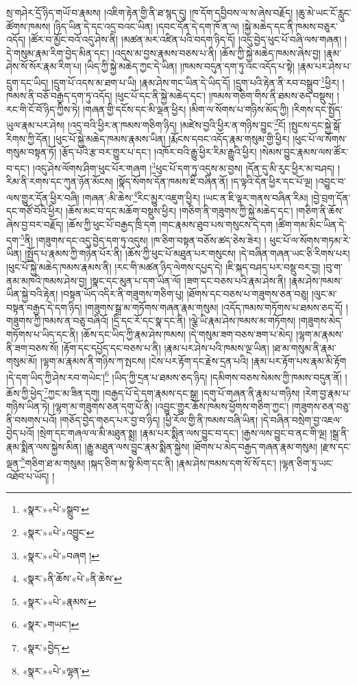 སྲ་གཤེར་དྲོ་ཉིད་གཡོ་བ་རྣམས། །འཇིག་རྟེན་གྱི་ནི་ཐ་སྙད་དུ། །ཁ་དོག་དབྱིབས་ལ་ས་ཞེས་བརྗོད། །ཆུ་མེ་ཡང་ངོ་རླུང་ཚོགས་ཁམས། །ཉིད་ཡིན་དེ་དང་འདྲ་བའང་ཡིན། །དབང་དོན་དེ་དག་ཁོ་ན་ལ། །སྐྱེ་མཆེད་དང་ནི་ཁམས་བཅུར་འདོད། །ཚོར་བ་མྱོང་བའོ་འདུ་ཤེས་ནི། །མཚན་མར་འཛིན་པའི་བདག་ཉིད་དོ། །འདུ་བྱེད་ཕུང་པོ་བཞི་ལས་གཞན། །དེ་གསུམ་རྣམ་རིག་བྱེད་མིན་དང་། །འདུས་མ་བྱས་རྣམས་བཅས་པ་ནི། །ཆོས་ཀྱི་སྐྱེ་མཆེད་ཁམས་ཞེས་བྱ། །རྣམ་ཤེས་སོ་སོར་རྣམ་རིག་པ། །ཡིད་ཀྱི་སྐྱེ་མཆེད་ཀྱང་དེ་ཡིན། །ཁམས་བདུན་དག་ཏུ་འང་འདོད་པ་སྟེ། །རྣམ་པར་ཤེས་པ་དྲུག་དང་ཡིད། །དྲུག་པོ་འདས་མ་ཐག་པ་ཡི། །རྣམ་ཤེས་གང་ཡིན་དེ་ཡིད་དོ། །དྲུག་པའི་རྟེན་ནི་རབ་བསྒྲུབ་\footnote{«སྣར་»«པེ་»སྒྲུབ་}ཕྱིར། །ཁམས་ནི་བཅོ་བརྒྱད་དག་ཏུ་འདོད། །ཕུང་པོ་དང་ནི་སྐྱེ་མཆེད་དང་། །ཁམས་གཅིག་གིས་ནི་ཐམས་ཅད་བསྡུས། །རང་གི་ངོ་བོ་ཉིད་ཀྱིས་ཏེ། །གཞན་གྱི་དངོས་དང་མི་ལྡན་ཕྱིར། །མིག་ལ་སོགས་པ་གཉིས་མོད་ཀྱི། །རིགས་དང་སྤྱོད་ཡུལ་རྣམ་པར་ཤེས། །འདྲ་བའི་ཕྱིར་ན་ཁམས་གཅིག་ཉིད། །མཛེས་བྱའི་ཕྱིར་ན་གཉིས་བྱུང་\footnote{«སྣར་»«པེ་»འབྱུང་}ངོ། །སྤུངས་དང་སྐྱེ་སྒོ་རིགས་ཀྱི་དོན། །ཕུང་པོ་སྐྱེ་མཆེད་ཁམས་རྣམས་ཡིན། །རྨོངས་དབང་འདོད་རྣམ་གསུམ་གྱི་ཕྱིར། །ཕུང་པོ་ལ་སོགས་གསུམ་བསྟན་ཏོ། །རྩོད་པའི་རྩ་བར་གྱུར་པ་དང་། །འཁོར་བའི་རྒྱུ་ཕྱིར་རིམ་རྒྱུའི་ཕྱིར། །སེམས་བྱུང་རྣམས་ལས་ཚོར་བ་དང་། །འདུ་ཤེས་ལོགས་ཤིག་ཕུང་པོར་གཞག །\footnote{«སྣར་»«པེ་»བཞག །}ཕུང་པོ་དག་ཏུ་འདུས་མ་བྱས། །དོན་དུ་མི་རུང་ཕྱིར་མ་བཤད། །རིམ་ནི་རགས་དང་ཀུན་ཉོན་མོངས། །སྣོད་སོགས་དོན་ཁམས་ཇི་བཞིན་ནོ། །ད་ལྟའི་དོན་ཕྱིར་དང་པོ་ལྔ། །འབྱུང་བ་ལས་གྱུར་དོན་ཕྱིར་བཞི། །གཞན་:མི་ཆེས་\footnote{«སྣར་»ནི་ཆོས་«པེ་»ནི་ཆེས་}རིང་མྱུར་འཇུག་ཕྱིར། །ཡང་ན་ཇི་ལྟར་གནས་བཞིན་རིམ། །བྱེ་བྲག་དོན་དང་གཙོ་བོའི་ཕྱིར། །ཆོས་མང་བ་དང་མཆོག་བསྡུས་ཕྱིར། །གཅིག་ནི་གཟུགས་ཀྱི་སྐྱེ་མཆེད་དང་། །གཅིག་ནི་ཆོས་ཞེས་བྱ་བར་བརྗོད། །ཆོས་ཀྱི་ཕུང་པོ་བརྒྱད་ཁྲི་དག །གང་རྣམས་ཐུབ་པས་གསུངས་དེ་དག །ཚིག་གམ་མིང་ཡིན་དེ་དག་\footnote{«སྣར་»«པེ་»རྣམས་}ནི། །གཟུགས་དང་འདུ་བྱེད་དག་ཏུ་འདུས། །ཁ་ཅིག་བསྟན་བཅོས་ཚད་ཅེས་ཟེར། །
ཕུང་པོ་ལ་སོགས་གཏམ་རེ་ཡིན། །སྤྱོད་པ་རྣམས་ཀྱི་གཉེན་པོར་ནི། །ཆོས་ཀྱི་ཕུང་པོ་མཐུན་པར་གསུངས། །དེ་བཞིན་གཞན་ཡང་ཅི་རིགས་པར། །ཕུང་པོ་སྐྱེ་མཆེད་ཁམས་རྣམས་ནི། །རང་གི་མཚན་ཉིད་ལེགས་དཔྱད་དེ། །ཇི་སྐད་བཤད་པར་བསྡུ་བར་བྱ། །བུ་ག་ནམ་མཁའི་ཁམས་ཤེས་བྱ། །སྣང་དང་མུན་པ་དག་ཡིན་ལོ། །ཟག་དང་བཅས་པའི་རྣམ་ཤེས་ནི། །རྣམ་ཤེས་ཁམས་ཡིན་སྐྱེ་བའི་རྟེན། །བསྟན་ཡོད་འདིར་ནི་གཟུགས་གཅིག་པུ། །ཐོགས་དང་བཅས་པ་གཟུགས་ཅན་བཅུ། །ལུང་མ་བསྟན་བརྒྱད་དེ་དག་ཉིད། །གཟུགས་སྒྲ་མ་གཏོགས་གཞན་རྣམ་གསུམ། །འདོད་ཁམས་གཏོགས་པ་ཐམས་ཅད་དོ། །གཟུགས་ཀྱི་ཁམས་ན་བཅུ་བཞིའོ། །དྲི་དང་རོ་དང་སྣ་དང་ནི། །ལྕེ་ཡི་རྣམ་ཤེས་ཁམས་མ་གཏོགས། །གཟུགས་མེད་གཏོགས་པ་ཡིད་དང་ནི། །ཆོས་དང་ཡིད་ཀྱི་རྣམ་ཤེས་ཁམས། །དེ་གསུམ་ཟག་བཅས་ཟག་པ་མེད། །ལྷག་མ་རྣམས་ནི་ཟག་བཅས་སོ། །རྟོག་དང་དཔྱོད་དང་བཅས་པ་ནི། །རྣམ་པར་ཤེས་པའི་ཁམས་ལྔ་ཡིན། །ཐ་མ་གསུམ་ནི་རྣམ་གསུམ་མོ། །ལྷག་མ་རྣམས་ནི་གཉིས་ཀ་སྤངས། །ངེས་པར་རྟོག་དང་རྗེས་དྲན་པའི། །རྣམ་པར་རྟོག་པས་རྣམ་མི་རྟོག །དེ་དག་ཡིད་ཀྱི་ཤེས་རབ་གཡེང་།\footnote{«སྣར་»གཡང་།} །ཡིད་ཀྱི་དྲན་པ་ཐམས་ཅད་ཉིད། །དམིགས་བཅས་སེམས་ཀྱི་ཁམས་བདུན་ནོ། །ཆོས་ཀྱི་ཕྱེད་\footnote{«སྣར་»བྱེད་}ཀྱང་མ་ཟིན་དགུ། །བརྒྱད་པོ་དེ་དག་རྣམས་དང་སྒྲ། །དགུ་པོ་གཞན་ནི་རྣམ་པ་གཉིས། །རེག་བྱ་རྣམ་པ་གཉིས་ཡིན་ཏེ། །ལྷག་མ་གཟུགས་ཅན་དགུ་པོ་ནི། །འབྱུང་གྱུར་ཆོས་ཁམས་ཕྱོགས་གཅིག་ཀྱང་། །གཟུགས་ཅན་བཅུ་ནི་བསགས་པའོ། །གཅོད་བྱེད་གཅད་པར་བྱ་བ་ཉིད། །ཕྱི་རོལ་གྱི་ནི་ཁམས་བཞི་ཡིན། །དེ་བཞིན་བསྲེག་བྱ་འཇལ་བྱེད་པའོ། །སྲེག་དང་གཞལ་ལ་མི་མཐུན་སྨྲ། །རྣམ་པར་སྨིན་ལས་བྱུང་བ་དང་། །རྒྱས་ལས་བྱུང་བ་ནང་གི་ལྔ། །སྒྲ་ནི་རྣམ་སྨིན་ལས་སྐྱེས་མིན། །རྒྱུ་མཐུན་ལས་བྱུང་རྣམ་སྨིན་སྐྱེས། །ཐོགས་པ་མེད་བརྒྱད་གཞན་རྣམ་གསུམ། །རྫས་དང་ལྡན་\footnote{«སྣར་»«པེ་»ལྷན་}གཅིག་ཐ་མ་གསུམ། །སྐད་ཅིག་མ་སྟེ་མིག་དང་ནི། །རྣམ་ཤེས་ཁམས་དག་སོ་སོ་དང་། །ལྷན་ཅིག་ཏུ་ཡང་འཐོབ་པ་ཡོད། །
